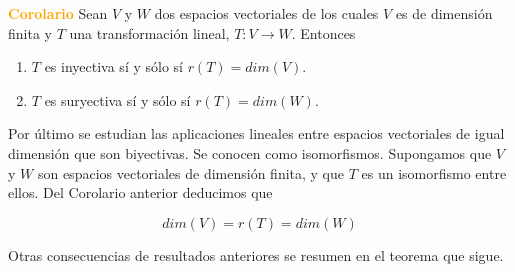 \textcolor{orange}{\textbf{Corolario}}
Sean $V$ y $W$ dos espacios vectoriales de los cuales $V$ es de dimensión finita y $T$ una transformación lineal, $T: V \rightarrow W$. Entonces


\begin{enumerate}

\item 

$T$ es inyectiva sí y sólo sí $r(T)=dim(V)$.


\item 

$T$ es suryectiva sí y sólo sí $r(T)=dim(W)$.


\end{enumerate}

\bigskip


\bigskip
Por último se estudian las aplicaciones lineales entre espacios vectoriales de igual dimensión que son biyectivas. Se conocen como isomorfismos.
Supongamos que $V$ y $W$ son espacios vectoriales de dimensión finita, y que $T$ es un isomorfismo entre ellos. Del Corolario anterior deducimos que 

$$dim(V)=r(T)=dim(W)$$


\bigskip

Otras consecuencias  de  resultados anteriores se resumen en el teorema que sigue.

\bigskip

\bigskip


